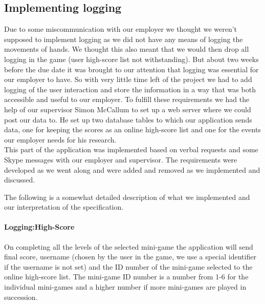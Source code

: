 \subsection{Implementing logging}

Due to some miscommunication with our employer we thought we weren't supposed to implement logging as we did not have any means of logging the movements of hands. 
We thought this also meant that we would then drop all logging in the game (user high-score list not withstanding). 
But about two weeks before the due date it was brought to our attention that logging was essential for our employer to have. 
So with very little time left of the project we had to add logging of the user interaction and store the information in a way that was both accessible and useful to our employer.
To fulfill these requirements we had the help of our supervisor Simon McCallum to set up a web server where we could post our data to. 
He set up two database tables to which our application sends data, one for keeping the scores as an online high-score list and one for the events our employer needs for his research.\\
This part of the application was implemented based on verbal requests and some Skype messages with our employer and supervisor. 
The requirements were developed as we went along and were added and removed as we implemented and discussed. 

The following is a somewhat detailed description of what we implemented and our interpretation of the specification.
\paragraph{Logging:High-Score}
On completing all the levels of the selected mini-game the application will send final score, username (chosen by the user in the game, we use a special identifier if the username is not set) and the ID number of the mini-game selected to the online high-score list. The mini-game ID number is a number from 1-6 for the individual mini-games and a higher number if more mini-games are played in succession.
